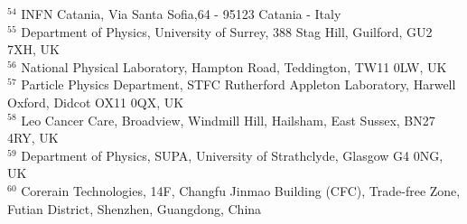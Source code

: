 {\begin{tabbing}
     $^{54}$ \> INFN Catania, Via Santa Sofia,64 - 95123 Catania - Italy\\
     $^{55}$ \> Department of Physics, University of Surrey, 388 Stag Hill, Guilford, GU2 7XH, UK\\
     $^{56}$ \> National Physical Laboratory, Hampton Road, Teddington, TW11 0LW, UK\\
     $^{57}$ \> Particle Physics Department, STFC Rutherford Appleton Laboratory, Harwell Oxford, Didcot OX11 0QX, UK\\
     $^{58}$ \> Leo Cancer Care, Broadview, Windmill Hill, Hailsham, East Sussex, BN27 4RY, UK\\
     $^{59}$ \> Department of Physics, SUPA, University of Strathclyde, Glasgow G4 0NG, UK\\
     $^{60}$ \> Corerain Technologies, 14F, Changfu Jinmao Building (CFC), Trade-free Zone, Futian District, Shenzhen, Guangdong, China\\
    ~   \> \\
  \end{tabbing}
}
